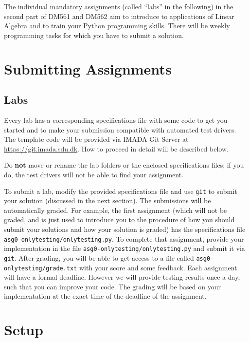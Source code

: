 
The individual mandatory assignments (called ``labs'' in the following) in the second part of DM561 and DM562 aim to introduce to applications of Linear Algebra and to train your Python programming skills. There will be weekly programming tasks for which you have to submit a solution.

\section*{Submitting Assignments} %

\subsection*{Labs}

Every lab has a corresponding specifications file with some code to get you started and to make your submission compatible with automated test drivers. The template code will be provided via IMADA Git Server at \url{https://git.imada.sdu.dk}. How to proceed in detail will be described below.

\begin{warn}
Do \textbf{not} move or rename the lab folders or the enclosed specifications files; if you do, the test drivers will not be able to find your assignment.
\end{warn}

To submit a lab, modify the provided specifications file and use \texttt{git} to submit your solution (discussed in the next section).
The submissions will be automatically graded. 
For example, the first assignment (which will not be graded, and is just used to introduce you to the procedure of how you should submit your solutions and how your solution is graded) has the specifications file \texttt{asg0-onlytesting/onlytesting.py}.
To complete that assignment, provide your implementation in the file \texttt{asg0-onlytesting/onlytesting.py} and submit it via \texttt{git}.
After grading, you will be able to get access to a file called \texttt{asg0-onlytesting/grade.txt} with your score and some feedback. Each assignment will have a formal deadline. However we will provide testing results once a day, such that you can improve your code. The grading will be based on your implementation at the exact time of the deadline of the assignment.

\newpage
\section*{Setup} %


